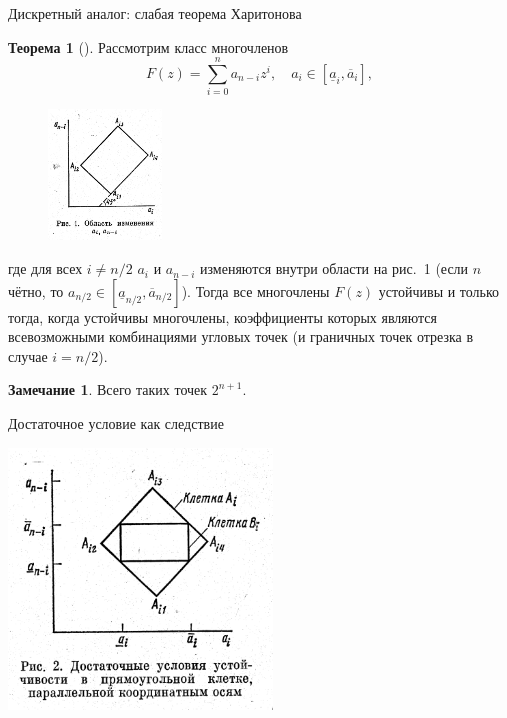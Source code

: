 \documentclass[notheorems,aspectratio=169]{beamer}
\theoremstyle{definition}
\newtheorem{theorem}{Теорема}
\newtheorem{remark}{Замечание}
\begin{document}
\begin{frame}{Дискретный аналог: слабая теорема Харитонова}
  \begin{theorem}[{\cite[стр.~1218]{KrausAndersonMansour1988}}]
    Рассмотрим класс многочленов
    \begin{equation*}
      F(z) = \sum_{i=0}^n a_{n-i} z^i, \quad a_i \in [\underline{a}_i, \overline{a}_i],
    \end{equation*}

    \begin{figure}
      \centering
      \includegraphics[width=0.27\textwidth]{WeakAnalogue_Area}
    \end{figure}
    где для всех $i \neq n/2$ $a_i$ и $a_{n-i}$ изменяются внутри области на рис.~1 (если $n$ чётно, то $a_{n/2} \in [\underline{a}_{n/2}, \overline{a}_{n/2}]$).
    Тогда все многочлены $F(z)$ устойчивы и только тогда, когда устойчивы многочлены, коэффициенты которых являются всевозможными
    комбинациями угловых точек (и граничных точек отрезка в случае $i = n/2$).
  \end{theorem}

  \begin{remark}
    Всего таких точек $2^{n+1}$.
  \end{remark}
\end{frame}

\begin{frame}{Достаточное условие как следствие}
  \begin{center}
    \includegraphics[width=7cm]{WeakAnalogue_SufficientArea}
  \end{center}
\end{frame}
\end{document}
